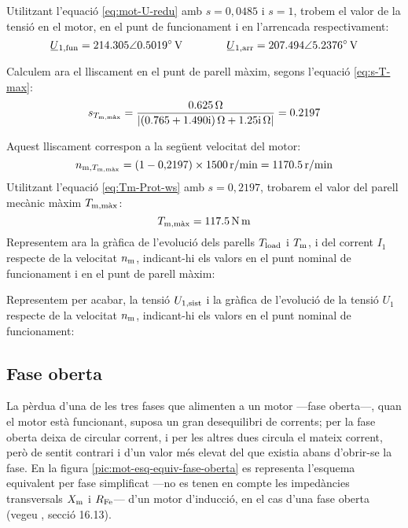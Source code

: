 \begin{exemple}
	Utilitzant l'equació \eqref{eq:mot-U-redu} amb $s=0{,}0485$ i $s=1$, trobem el valor de la tensió en el motor, en el punt de funcionament i en l'arrencada respectivament:
	\[
		\cmplx{U}\ped{1,fun} = \complexqty{214,305:0,5019}{V} \qquad \qquad
		\cmplx{U}\ped{1,arr} = \complexqty{207,494:5,2376}{V}
	\]
	
	Calculem ara el lliscament en el punt de parell màxim, segons l'equació \eqref{eq:s-T-max}:
	\[
		s_{T\ped{m,\text{màx}}} =  \frac{\qty{0,625}{\ohm}}{|\complexqty{0,765+j1,490}{\ohm} + \complexqty{j1,25}{\ohm}|} = \num{0,2197} 
	\]
	
	Aquest lliscament correspon a la següent  velocitat del motor:
	\[
		n_{\text{m},T_\mathrm{m,\text{màx}}} = (1 - 0{,}2197) \times \qty{1500}{r/min} = \qty{1170,5}{r/min}
	\]
	Utilitzant l'equació  \eqref{eq:Tm-Prot-ws} amb
	 $s=0{,}2197$, trobarem el valor del parell mecànic màxim  $T_\mathrm{m,\text{màx}}$:
	\[
		T_\mathrm{m,\text{màx}} = \qty{117,5}{N.m}
	\]	
	Representem ara la gràfica de l'evolució dels parells $T_\mathrm{load}$ i   $T_\mathrm{m}$, i del	corrent $I_1$ respecte de la velocitat $n_\mathrm{m}$, indicant-hi els valors en el punt nominal de funcionament i en el punt de parell màxim:
	\begin{center}
		\fontsize{10pt}{11pt}\selectfont
		
	\end{center}
	Representem per acabar, la tensió $U_\mathrm{1,sist}$ i la gràfica de l'evolució de la tensió $U_1$ respecte de la velocitat $n_\mathrm{m}$, indicant-hi els valors en el punt nominal de funcionament:
	\begin{center}
		\fontsize{10pt}{11pt}\selectfont
		
	\end{center}
\end{exemple}	



\subsection{Fase oberta}\label{sec:mot-fase.oberta}

La pèrdua d'una de les tres fases que alimenten a un motor ---fase oberta---, quan el motor està funcionant, suposa un gran desequilibri de corrents; per la fase oberta deixa de circular corrent, i per les altres dues circula el mateix corrent, però de sentit contrari i d'un valor més elevat del que existia abans d'obrir-se la fase.
En la figura \vref{pic:mot-esq-equiv-fase-oberta} es representa l'esquema  equivalent per fase simplificat ---no es tenen en compte les impedàncies transversals $X_\mathrm{m}$ i $R_\mathrm{Fe}$--- d'un   motor d'inducció, en el cas d'una fase oberta (vegeu \cite{REI}, secció 16.13).

